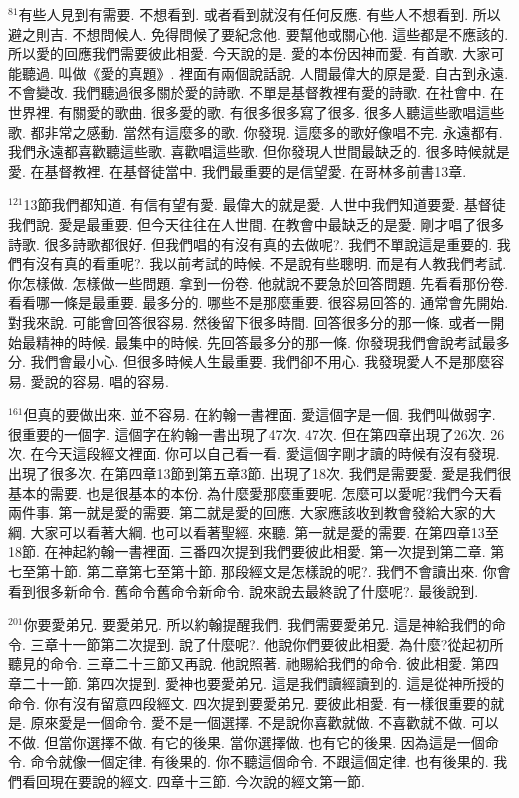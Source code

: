 \documentclass{book}
\begin{document}
$^{81}$有些人見到有需要.
不想看到.
或者看到就沒有任何反應.
有些人不想看到.
所以避之則吉.
不想問候人.
免得問候了要紀念他.
要幫他或關心他.
這些都是不應該的.
所以愛的回應我們需要彼此相愛.
今天說的是.
愛的本份因神而愛.
有首歌.
大家可能聽過.
叫做《愛的真題》.
裡面有兩個說話說.
人間最偉大的原是愛.
自古到永遠.
不會變改.
我們聽過很多關於愛的詩歌.
不單是基督教裡有愛的詩歌.
在社會中.
在世界裡.
有關愛的歌曲.
很多愛的歌.
有很多很多寫了很多.
很多人聽這些歌唱這些歌.
都非常之感動.
當然有這麼多的歌.
你發現.
這麼多的歌好像唱不完.
永遠都有.
我們永遠都喜歡聽這些歌.
喜歡唱這些歌.
但你發現人世間最缺乏的.
很多時候就是愛.
在基督教裡.
在基督徒當中.
我們最重要的是信望愛.
在哥林多前書13章.

$^{121}$13節我們都知道.
有信有望有愛.
最偉大的就是愛.
人世中我們知道要愛.
基督徒我們說.
愛是最重要.
但今天往往在人世間.
在教會中最缺乏的是愛.
剛才唱了很多詩歌.
很多詩歌都很好.
但我們唱的有沒有真的去做呢?.
我們不單說這是重要的.
我們有沒有真的看重呢?.
我以前考試的時候.
不是說有些聰明.
而是有人教我們考試.
你怎樣做.
怎樣做一些問題.
拿到一份卷.
他就說不要急於回答問題.
先看看那份卷.
看看哪一條是最重要.
最多分的.
哪些不是那麼重要.
很容易回答的.
通常會先開始.
對我來說.
可能會回答很容易.
然後留下很多時間.
回答很多分的那一條.
或者一開始最精神的時候.
最集中的時候.
先回答最多分的那一條.
你發現我們會說考試最多分.
我們會最小心.
但很多時候人生最重要.
我們卻不用心.
我發現愛人不是那麼容易.
愛說的容易.
唱的容易.

$^{161}$但真的要做出來.
並不容易.
在約翰一書裡面.
愛這個字是一個.
我們叫做弱字.
很重要的一個字.
這個字在約翰一書出現了47次.
47次.
但在第四章出現了26次.
26次.
在今天這段經文裡面.
你可以自己看一看.
愛這個字剛才讀的時候有沒有發現.
出現了很多次.
在第四章13節到第五章3節.
出現了18次.
我們是需要愛.
愛是我們很基本的需要.
也是很基本的本份.
為什麼愛那麼重要呢.
怎麼可以愛呢?我們今天看兩件事.
第一就是愛的需要.
第二就是愛的回應.
大家應該收到教會發給大家的大綱.
大家可以看著大綱.
也可以看著聖經.
來聽.
第一就是愛的需要.
在第四章13至18節.
在神起約翰一書裡面.
三番四次提到我們要彼此相愛.
第一次提到第二章.
第七至第十節.
第二章第七至第十節.
那段經文是怎樣說的呢?.
我們不會讀出來.
你會看到很多新命令.
舊命令舊命令新命令.
說來說去最終說了什麼呢?.
最後說到.

$^{201}$你要愛弟兄.
要愛弟兄.
所以約翰提醒我們.
我們需要愛弟兄.
這是神給我們的命令.
三章十一節第二次提到.
說了什麼呢?.
他說你們要彼此相愛.
為什麼?從起初所聽見的命令.
三章二十三節又再說.
他說照著.
祂賜給我們的命令.
彼此相愛.
第四章二十一節.
第四次提到.
愛神也要愛弟兄.
這是我們讀經讀到的.
這是從神所授的命令.
你有沒有留意四段經文.
四次提到要愛弟兄.
要彼此相愛.
有一樣很重要的就是.
原來愛是一個命令.
愛不是一個選擇.
不是說你喜歡就做.
不喜歡就不做.
可以不做.
但當你選擇不做.
有它的後果.
當你選擇做.
也有它的後果.
因為這是一個命令.
命令就像一個定律.
有後果的.
你不聽這個命令.
不跟這個定律.
也有後果的.
我們看回現在要說的經文.
四章十三節.
今次說的經文第一節.
\end{document}
